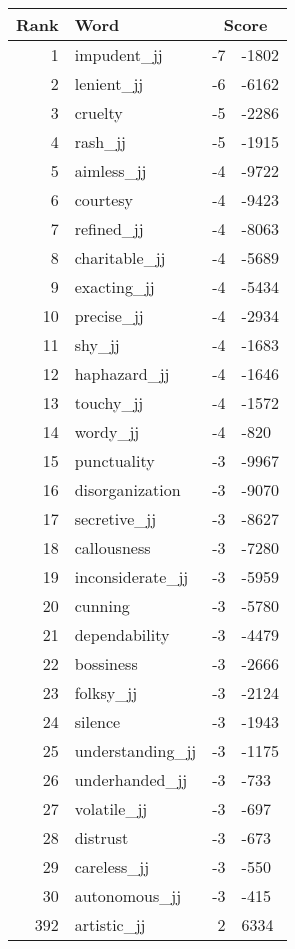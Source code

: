 \begin{longtable}[!htbp]{| rlr@{.}l |}
    \hline
    \textbf{Rank} & \textbf{Word} & \multicolumn{2}{c|}{\textbf{Score}} \\
    \hline
    \endhead
    1 & impudent\_jj & -7 & -1802 \\
    2 & lenient\_jj & -6 & -6162 \\
    3 & cruelty & -5 & -2286 \\
    4 & rash\_jj & -5 & -1915 \\
    5 & aimless\_jj & -4 & -9722 \\
    6 & courtesy & -4 & -9423 \\
    7 & refined\_jj & -4 & -8063 \\
    8 & charitable\_jj & -4 & -5689 \\
    9 & exacting\_jj & -4 & -5434 \\
    10 & precise\_jj & -4 & -2934 \\
    11 & shy\_jj & -4 & -1683 \\
    12 & haphazard\_jj & -4 & -1646 \\
    13 & touchy\_jj & -4 & -1572 \\
    14 & wordy\_jj & -4 & -820 \\
    15 & punctuality & -3 & -9967 \\
    16 & disorganization & -3 & -9070 \\
    17 & secretive\_jj & -3 & -8627 \\
    18 & callousness & -3 & -7280 \\
    19 & inconsiderate\_jj & -3 & -5959 \\
    20 & cunning & -3 & -5780 \\
    21 & dependability & -3 & -4479 \\
    22 & bossiness & -3 & -2666 \\
    23 & folksy\_jj & -3 & -2124 \\
    24 & silence & -3 & -1943 \\
    25 & understanding\_jj & -3 & -1175 \\
    26 & underhanded\_jj & -3 & -733 \\
    27 & volatile\_jj & -3 & -697 \\
    28 & distrust & -3 & -673 \\
    29 & careless\_jj & -3 & -550 \\
    30 & autonomous\_jj & -3 & -415 \\
    392 & artistic\_jj & 2 & 6334 \\

\end{longtable}
